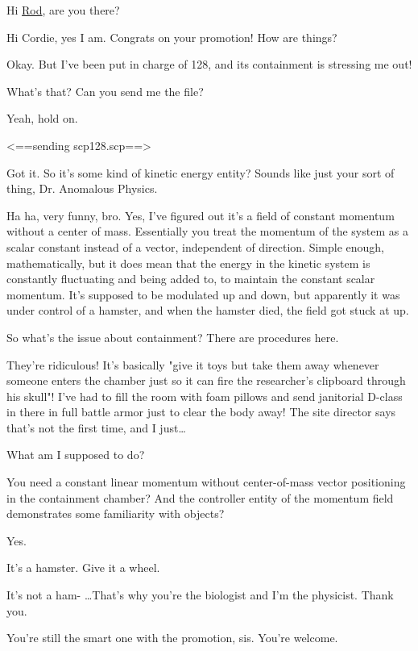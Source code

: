 \begin{scpbox}

 Hi \hyperref[chap:SCP-2289]{Rod}, are you there?

 Hi Cordie, yes I am. Congrats on your promotion! How are things?

 Okay. But I've been put in charge of 128, and its containment is stressing me out!

 What's that? Can you send me the file?

 Yeah, hold on.

<==sending scp128.scp==>

 Got it. So it's some kind of kinetic energy entity? Sounds like just your sort of thing, Dr. Anomalous Physics.

 Ha ha, very funny, bro. Yes, I've figured out it's a field of constant momentum without a center of mass. Essentially you treat the momentum of the system as a scalar constant instead of a vector, independent of direction. Simple enough, mathematically, but it does mean that the energy in the kinetic system is constantly fluctuating and being added to, to maintain the constant scalar momentum. It's supposed to be modulated up and down, but apparently it was under control of a hamster, and when the hamster died, the field got stuck at up.

 So what's the issue about containment? There are procedures here.

 They're ridiculous! It's basically "give it toys but take them away whenever someone enters the chamber just so it can fire the researcher's clipboard through his skull"! I've had to fill the room with foam pillows and send janitorial D-class in there in full battle armor just to clear the body away! The site director says that's not the first time, and I just…

 What am I supposed to do?

 You need a constant linear momentum without center-of-mass vector positioning in the containment chamber? And the controller entity of the momentum field demonstrates some familiarity with objects?

 Yes.

 It's a hamster. Give it a wheel.

 It's not a ham- …That's why you're the biologist and I'm the physicist. Thank you.

 You're still the smart one with the promotion, sis. You're welcome.

\end{scpbox}
